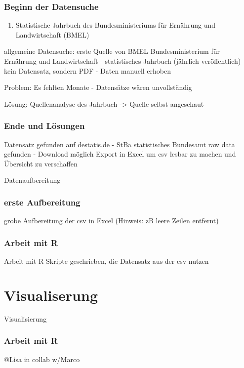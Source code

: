 \documentclass{beamer}
\begin{document}
\begin{frame}
	\frametitle{Beginn der Datensuche}
		\begin{enumerate}
			\item Statistische Jahrbuch des Bundesministeriums für Ernährung und Landwirtschaft (BMEL)
		\end{enumerate}	

	allgemeine Datensuche: erste Quelle von 
	BMEL Bundesministerium für Ernährung und Landwirtschaft - statistisches Jahrbuch (jährlich veröffentlich)
	kein Datensatz, sondern PDF - Daten manuell erhoben

	Problem: Es fehlten Monate - Datensätze wären unvollständig

	Lösung: Quellenanalyse des Jahrbuch -> Quelle selbst angeschaut 

\end{frame}

\begin{frame}
	\frametitle{Ende und Lösungen}
	Datensatz gefunden auf destatis.de - StBa statistisches Bundesamt 
	raw data gefunden - Download möglich
	Export in Excel um csv lesbar zu machen und Übersicht zu verschaffen
\end{frame}

\begin{frame}
	\begin{center}
		{\Huge Datenaufbereitung}
	\end{center}
\end{frame}

\begin{frame}
	\frametitle{erste Aufbereitung}
	grobe Aufbereitung der csv in Excel (Hinweis: zB leere Zeilen entfernt)
\end{frame}
\begin{frame}
	\frametitle{Arbeit mit R}
	Arbeit mit R
	Skripte geschrieben, die Datensatz aus der csv nutzen
\end{frame}

\section{Visualiserung}
\begin{frame}
	\begin{center}
		{\Huge Visualisierung}
	\end{center}
\end{frame}

\begin{frame}
	\frametitle{Arbeit mit R}
	@Lisa in collab w/Marco
\end{frame}
\end{document}
